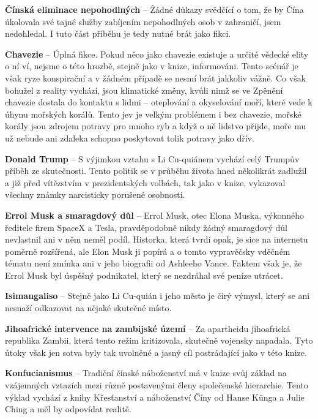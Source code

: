 \textbf{Čínská eliminace nepohodlných} – Žádné důkazy svědčící o tom, že by Čína úkolovala své tajné služby zabíjením nepohodlných osob v zahraničí, jsem nedohledal. I tuto část příběhu je tedy nutné brát jako fikci. \vspace{0.5cm}

\textbf{Chavezie} – Úplná fikce. Pokud něco jako chavezie existuje a určité vědecké elity o ní ví, nejsme o této hrozbě, stejně jako v knize, informováni. Tento scénář je však ryze konspirační a v žádném případě se nesmí brát jakkoliv vážně. 
Co však bohužel z reality vychází, jsou klimatické změny, kvůli nimž se ve Zpěnění chavezie dostala do kontaktu s lidmi – oteplování a okyselování moří, které vede k úhynu mořských korálů. Tento jev je velkým problémem i bez chavezie, mořské korály jsou zdrojem potravy pro mnoho ryb a když o ně lidstvo přijde, moře mu už nebude ani zdaleka schopno poskytovat tolik potravy jako dřív.  \vspace{0.5cm}

\textbf{Donald Trump} – S výjimkou vztahu s Li Cu-quiánem vychází celý Trumpův příběh ze skutečnosti. Tento politik se v průběhu života hned několikrát zadlužil a již před vítězstvím v prezidentských volbách, tak  jako v knize, vykazoval všechny známky narcisticky porušené osobnosti.\vspace{0.5cm}

\textbf{Errol Musk a smaragdový důl} – Errol Musk, otec Elona Muska, výkonného ředitele firem SpaceX a Tesla, pravděpodobně nikdy žádný smaragdový důl nevlastnil ani v něm neměl podíl. Historka, která tvrdí opak, je sice na internetu poměrně rozšířená, ale Elon Musk ji popírá a o tomto vypravěčsky vděčném tématu není zmínka ani v jeho biografii od Ashleeho Vance. Faktem však je, že Errol Musk byl úspěšný podnikatel, který se nezdráhal své peníze utrácet.\vspace{0.5cm}
 
\textbf{Isimangaliso} – Stejně jako Li Cu-quián i jeho město je čirý výmysl, který se ani nesnaží odkazovat na nějaké skutečné místo. \vspace{0.5cm}

\textbf{Jihoafrické intervence na zambijské území} – Za apartheidu jihoafrická republika Zambii, která tento režim kritizovala, skutečně vojensky napadala. Tyto útoky však jen sotva byly tak uvolněné a jasný cíl postrádající jako v této knize.\vspace{0.5cm}

\textbf{Konfucianismus} – Tradiční čínské náboženství má v knize svůj základ na vzájemných vztazích mezi různě postavenými členy společenské hierarchie. Tento výklad vychází z knihy Křesťanství a náboženství Číny od Hanse Künga a Julie Ching a měl by odpovídat realitě. \vspace{0.5cm}

